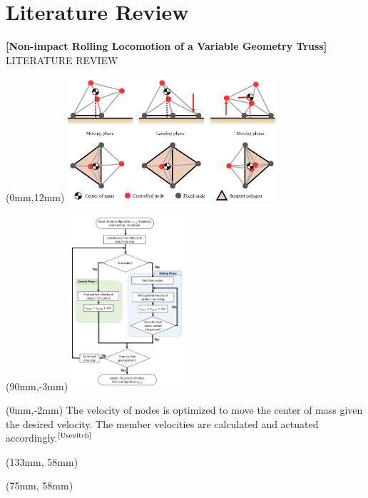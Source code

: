 \documentclass[11pt,aspectratio=169]{beamer}
\begin{document}
\section{Literature Review}

\begin{frame}[fragile]{\fontsize{10}{10}\selectfont\textbf{[Non-impact Rolling Locomotion of a Variable Geometry Truss]} \hfill \fontsize{8}{8}\selectfont LITERATURE REVIEW \newline [2019]}
    
        \begin{textblock*}{5cm}(0mm,12mm) %
        \includegraphics[height=46mm]{elements/[8]-LOCO.png}
        \end{textblock*}

        \begin{textblock*}{5cm}(90mm,-3mm) %
        \includegraphics[height=65mm]{elements/[9]-LOCO.png}
        \end{textblock*}

        \begin{textblock*}{87mm}(0mm,-2mm)
        The velocity of nodes is optimized to move the center of mass given the desired velocity. The member velocities are calculated and actuated accordingly.$^{\text{\cite{Usevitch}}}$
        \end{textblock*}

        \begin{textblock*}{5cm}(133mm, 58mm) %
        {\tiny \cite{8610002}}
        \end{textblock*}

        \begin{textblock*}{5cm}(75mm, 58mm) %
        {\tiny \cite{bb}}
        \end{textblock*}
        
        \vspace{52mm}
\end{frame}
\end{document}
